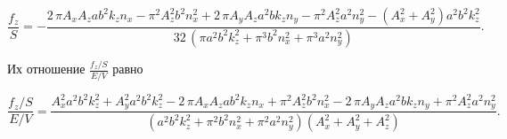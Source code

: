 \documentclass[twoside, 10pt]{article}
\begin{document}

\begin{equation}\frac{f_z}{S} = -\frac{2 \, \pi A_{x} A_{z} a b^{2} k_{z} n_{x} - \pi^{2} A_{z}^{2} b^{2} n_{x}^{2} + 2 \, \pi A_{y} A_{z} a^{2} b k_{z} n_{y} - \pi^{2} A_{z}^{2} a^{2} n_{y}^{2} - {\left(A_{x}^{2} + A_{y}^{2}\right)} a^{2} b^{2} k_{z}^{2}}{32 \, {\left(\pi a^{2} b^{2} k_{z}^{2} + \pi^{3} b^{2} n_{x}^{2} + \pi^{3} a^{2} n_{y}^{2}\right)}}.\end{equation}

    Их отношение \(\frac{f_z/S}{E/V}\) равно

\begin{equation}\frac{f_z/S}{E/V} = \frac{A_{x}^{2} a^{2} b^{2} k_{z}^{2} + A_{y}^{2} a^{2} b^{2} k_{z}^{2} - 2 \, \pi A_{x} A_{z} a b^{2} k_{z} n_{x} + \pi^{2} A_{z}^{2} b^{2} n_{x}^{2} - 2 \, \pi A_{y} A_{z} a^{2} b k_{z} n_{y} + \pi^{2} A_{z}^{2} a^{2} n_{y}^{2}}{{\left(a^{2} b^{2} k_{z}^{2} + \pi^{2} b^{2} n_{x}^{2} + \pi^{2} a^{2} n_{y}^{2}\right)} {\left(A_{x}^{2} + A_{y}^{2} + A_{z}^{2}\right)}}.\end{equation}
\end{document}
